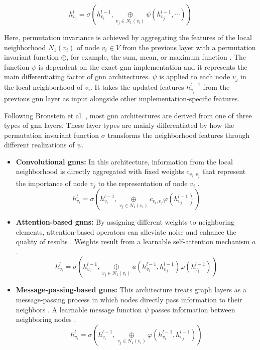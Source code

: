 \begin{equation}
    h_{v_i}^l = \sigma(h_{v_i}^{l-1}, \underset{v_j \in N_1(v_i)}{\oplus} \psi(h_{v_j}^{l-1}, \cdots))
\end{equation}

Here, permutation invariance is achieved by aggregating the features of the local neighborhood $N_1(v_i)$ of node $v_i \in V$ from the previous layer with a permutation invariant function $\oplus$, for example, the sum, mean, or maximum function \cite{bronstein_geometric_2021}. The function $\psi$ is dependent on the exact \gls{gnn} implementation and it represents the main differentiating factor of \gls{gnn} architectures. $\psi$ is applied to each node $v_j$ in the local neighborhood of $v_i$. It takes the updated features $h_{v_j}^{l-1}$ from the previous \gls{gnn} layer as input alongside other implementation-specific features.

Following Bronstein et al. \cite{bronstein_geometric_2021}, most \gls{gnn} architectures are derived from one of three types of \gls{gnn} layers. These layer types are mainly differentiated by how the permutation invariant function $\sigma$ transforms the neighborhood features through different realizations of $\psi$.

\begin{itemize}
    \item \textbf{Convolutional \glspl{gnn}:} In this architecture, information from the local neighborhood is directly aggregated with fixed weights $c_{v_i, v_j}$ that represent the importance of node $v_j$ to the representation of node $v_i$ \cite{bronstein_geometric_2021, wu_comprehensive_2021}.
    \begin{equation}
        h_{v_i}^l = \sigma(h_{v_i}^{l-1}, \underset{v_j \in N_1(v_i)}{\oplus} c_{v_i, v_j} \varphi(h_{v_j}^{l-1}))
    \end{equation}
    
    \item \textbf{Attention-based \glspl{gnn}:} By assigning different weights to neighboring elements, attention-based operators can alleviate noise and enhance the quality of results \cite{zhou_graph_2020}. Weights result from a learnable self-attention mechanism $a$ \cite{bronstein_geometric_2021}.
    \begin{equation}
        h_{v_i}^l = \sigma(h_{v_i}^{l-1}, \underset{v_j \in N_1(v_i)}{\oplus} a(h_{v_i}^{l-1}, h_{v_j}^{l-1}) \varphi(h_{v_j}^{l-1}))
    \end{equation}

    \item \textbf{Message-passing-based \glspl{gnn}:} This architecture treats graph layers as a message-passing process in which nodes directly pass information to their neighbors \cite{wu_comprehensive_2021}. A learnable message function $\psi$ passes information between neighboring nodes \cite{bronstein_geometric_2021}.
    \begin{equation}
        h_{v_i}^l = \sigma(h_{v_i}^{l-1}, \underset{v_j \in N_1(v_i)}{\oplus} \varphi(h_{v_i}^{l-1}, h_{v_j}^{l-1}))
    \end{equation}
\end{itemize}

